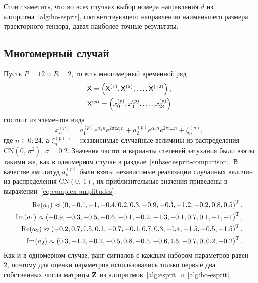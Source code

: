 \documentclass[specialist,
  substylefile=spbu_report.rtx,
subf,href,colorlinks=true, 12pt]{disser}
\theoremstyle{plain}
\theoremstyle{definition}
\theoremstyle{remark}
\newcommand{\iu}{\mathrm{i}}
\begin{document}
Стоит заметить, что во всех случаях выбор номера направления $d$ из
алгоритма~\ref{alg:ho-esprit}, соответствующего направлению
наименьшего размера
траекторного тензора, давал наиболее точные результаты.

\subsection{Многомерный случай}\label{subsec:mv-esprit-comparison}
Пусть $P=12$ и $R=2$, то есть многомерный временной ряд
\begin{gather*}
  \mathsf{X} = \left(\mathsf{X}^{(1)}, \mathsf{X}^{(2)}, \ldots, \mathsf{X}^{(12)}\right),\\
  \mathsf{X}^{(p)} = \left(x_0^{(p)}, x_1^{(p)}, \ldots, x_{24}^{(p)}\right)
\end{gather*}
состоит из элементов вида
\[
  x_n^{(p)} = a_1^{(p)} e^{ \alpha_1 n }
  e^{2 \pi \iu \omega_1 n} +
  a_2^{(p)} e^{ \alpha_2 n }
  e^{2 \pi \iu \omega_2 n} + \zeta_n^{(p)},
\]
где $n \in \overline{0:24}$, а $\zeta_n^{(p)}$ "--- независимые
случайные величины из
распределения $\mathrm{CN}(0,\, \sigma^2)$, $\sigma=0.2$.
Значения частот и варианты степеней затухания были взяты такими же, как
в одномерном случае в разделе~\ref{subsec:esprit-comparison}.
В качестве амплитуд $a_k^{(p)}$ были взяты независимые реализации
случайных величин из распределения $\mathrm{CN}(0,\, 1)$,
их приблизительные значения приведены в
выражении~\eqref{eq:complex-amplitudes}.
\begin{gather}
  \label{eq:complex-amplitudes}
  \begin{split}
    \operatorname{Re}(a_1) \approx \left( 0, -0.1, -1, -0.4, 0.2,
    0.3, -0.9, -0.3, -1.2, -0.2, 0.8, 0.5\right)^{\mathrm{T}}, \\
    \operatorname{Im}(a_1) \approx \left(-0.9, -0.3, -0.5, -0.6,
    -0.1, -0.2, -1.3, -0.1, 0.7, 0.1, -1, -1 \right)^{\mathrm{T}}, \\
    \operatorname{Re}(a_2) \approx \left( -0.2, 0.7, 0.5, 0.1, -0.7,
    -0.1, 0.7, 0.3, -0.4, -1.5, -0.5, -1.5\right)^{\mathrm{T}}, \\
    \operatorname{Im}(a_2) \approx \left( 0.3, -1.2, -0.2, -0.5, 0.8,
    -0.5, -0.6, 0.6, -0.7, 0, 0.2, -0.2\right)^{\mathrm{T}}. \\
  \end{split}
\end{gather}
Как и в одномерном случае, ранг сигналов с каждым набором параметров равен 2,
поэтому для оценки параметров использовались только первые два собственных
числа матрицы $\mathbf{Z}$ из алгоритмов~\ref{alg:esprit} и~\ref{alg:ho-esprit}.
\end{document}
